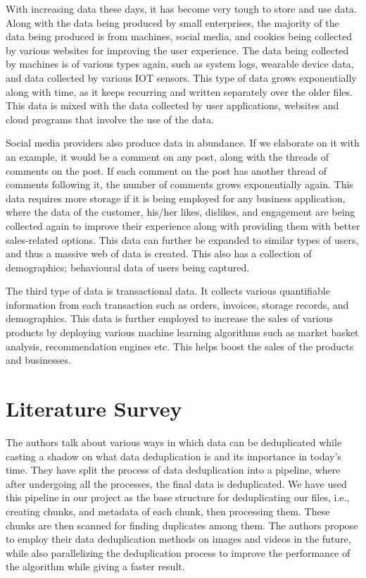 \documentclass[%
 aip,
cp,  %
 amsmath,amssymb,%
 reprint,%
]{revtex4-2}
\begin{document}
With increasing data these days, it has become very tough to store and use data. Along with the data being produced by small enterprises, the majority of the data being produced is from machines, social media, and cookies being collected by various websites for improving the user experience. The data being collected by machines is of various types again, such as system logs, wearable device data, and data collected by various IOT sensors. This type of data grows exponentially along with time, as it keeps recurring and written separately over the older files. This data is mixed with the data collected by user applications, websites and cloud programs that involve the use of the data. 

Social media providers also produce data in abundance. If we elaborate on it with an example, it would be a comment on any post, along with the threads of comments on the post. If each comment on the post has another thread of comments following it, the number of comments grows exponentially again. This data requires more storage if it is being employed for any business application, where the data of the customer, his/her likes, dislikes, and engagement are being collected again to improve their experience along with providing them with better sales-related options. This data can further be expanded to similar types of users, and thus a massive web of data is created. This also has a collection of demographics; behavioural data of users being captured. 

The third type of data is transactional data. It collects various quantifiable information from each transaction such as orders, invoices, storage records, and demographics. This data is further employed to increase the sales of various products by deploying various machine learning algorithms such as market basket analysis, recommendation engines etc. This helps boost the sales of the products and businesses.

\section{\label{sec:litreview}Literature Survey}
The authors \cite{mb15} talk about various ways in which data can be deduplicated while casting a shadow on what data deduplication is and its importance in today’s time. They have split the process of data deduplication into a pipeline, where after undergoing all the processes, the final data is deduplicated. We have used this pipeline in our project as the base structure for deduplicating our files, i.e., creating chunks, and metadata of each chunk, then processing them. These chunks are then scanned for finding duplicates among them. The authors propose to employ their data deduplication methods on images and videos in the future, while also parallelizing the deduplication process to improve the performance of the algorithm while giving a faster result.
\end{document}
